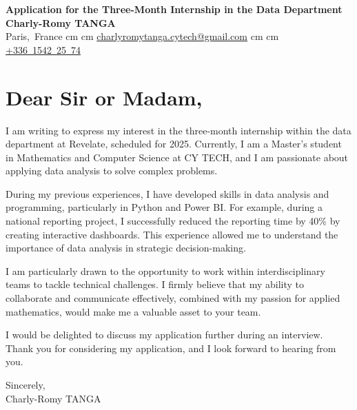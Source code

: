 \documentclass[10pt, letterpaper]{article}
\begin{document}
    \begin{center}
        \textbf{\LARGE Application for the Three-Month Internship in the Data Department} \\[0.2cm]
        \textbf{\large Charly-Romy TANGA} \\[0.2cm]
        \normalsize
        \mbox{{\color{black}\footnotesize\faMapMarker*}\hspace*{0.13cm}Paris, France}%
         cm%
        \AND%
         cm%
        \mbox{\href{mailto:charlyromytanga.cytech@gmail.com}{\color{black}{\footnotesize\faEnvelope[regular]}\hspace*{0.13cm}charlyromytanga.cytech@gmail.com}}%
         cm%
        \AND%
         cm%
        \mbox{\href{tel:+33615422574}{\color{black}{\footnotesize\faPhone*}\hspace*{0.13cm}+336 1542 25 74}}%
    \end{center}

    \vspace{1cm}

    \section*{Dear Sir or Madam,}

    I am writing to express my interest in the three-month internship within the data department at Revelate, scheduled for 2025. Currently, I am a Master’s student in Mathematics and Computer Science at CY TECH, and I am passionate about applying data analysis to solve complex problems.

    During my previous experiences, I have developed skills in data analysis and programming, particularly in Python and Power BI. For example, during a national reporting project, I successfully reduced the reporting time by 40\% by creating interactive dashboards. This experience allowed me to understand the importance of data analysis in strategic decision-making.

    I am particularly drawn to the opportunity to work within interdisciplinary teams to tackle technical challenges. I firmly believe that my ability to collaborate and communicate effectively, combined with my passion for applied mathematics, would make me a valuable asset to your team.

    I would be delighted to discuss my application further during an interview. Thank you for considering my application, and I look forward to hearing from you.

    \vspace{1cm}

    \begin{flushright}
        Sincerely, \\[0.5cm]
        Charly-Romy TANGA
    \end{flushright}
\end{document}
